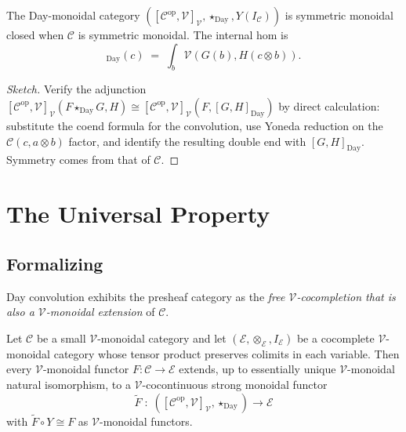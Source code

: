 \begin{theorem}
\label{thm:day-closed}
The Day-monoidal category $([\mathcal{C}^{\mathrm{op}}, \mathcal{V}]_\mathcal{V},
\star_{\mathrm{Day}}, Y(I_\mathcal{C}))$ is symmetric monoidal closed when
$\mathcal{C}$ is symmetric monoidal. The internal hom is
\begin{equation*}
  [G, H]_{\mathrm{Day}}(c) \;=\; \int_b \mathcal{V}(G(b), H(c \otimes b)).
\end{equation*}
\end{theorem}

\begin{proof}[Sketch]
Verify the adjunction $[\mathcal{C}^{\mathrm{op}}, \mathcal{V}]_\mathcal{V}
(F \star_{\mathrm{Day}} G, H) \cong [\mathcal{C}^{\mathrm{op}}, \mathcal{V}]_\mathcal{V}
(F, [G, H]_{\mathrm{Day}})$ by direct calculation: substitute the coend formula
for the convolution, use Yoneda reduction on the $\mathcal{C}(c, a \otimes b)$
factor, and identify the resulting double end with $[G, H]_{\mathrm{Day}}$.
Symmetry comes from that of $\mathcal{C}$.
\end{proof}


\section{The Universal Property}
\label{sec:day-universal}

\subsection{Formalizing}

Day convolution exhibits the presheaf category as the \emph{free
$\mathcal{V}$-cocompletion that is also a $\mathcal{V}$-monoidal extension}
of $\mathcal{C}$.

\begin{theorem}
\label{thm:day-universal}
Let $\mathcal{C}$ be a small $\mathcal{V}$-monoidal category and let
$(\mathcal{E}, \otimes_\mathcal{E}, I_\mathcal{E})$ be a cocomplete
$\mathcal{V}$-monoidal category whose tensor product preserves colimits in
each variable. Then every $\mathcal{V}$-monoidal functor $F : \mathcal{C} \to
\mathcal{E}$ extends, up to essentially unique $\mathcal{V}$-monoidal natural
isomorphism, to a $\mathcal{V}$-cocontinuous strong monoidal functor
\begin{equation*}
  \widetilde F \;:\; ([\mathcal{C}^{\mathrm{op}}, \mathcal{V}]_\mathcal{V},
  \star_{\mathrm{Day}}) \to \mathcal{E}
\end{equation*}
with $\widetilde F \circ Y \cong F$ as $\mathcal{V}$-monoidal functors.
\end{theorem}


